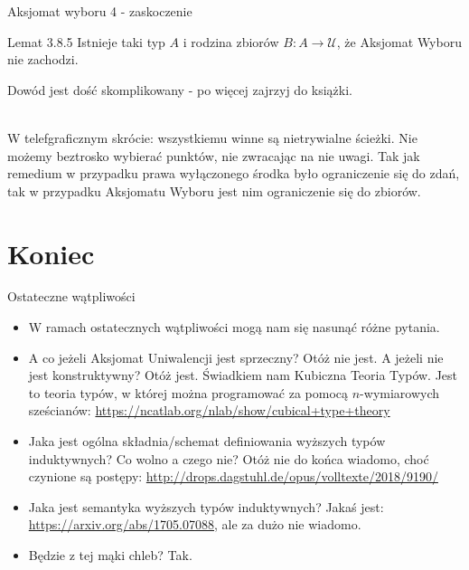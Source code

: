 \documentclass{beamer}
\newcommand{\U}{\mathcal{U}}
\begin{document}
\begin{frame}{Aksjomat wyboru 4 - zaskoczenie}

\begin{block}{Lemat 3.8.5}
Istnieje taki typ $A$ i rodzina zbiorów $B : A \to \U$, że Aksjomat Wyboru nie zachodzi.
\end{block}

Dowód jest dość skomplikowany - po więcej zajrzyj do książki. \\~\

W telefgraficznym skrócie: wszystkiemu winne są nietrywialne ścieżki. Nie możemy beztrosko wybierać punktów, nie zwracając na nie uwagi. Tak jak remedium w przypadku prawa wyłączonego środka było ograniczenie się do zdań, tak w przypadku Aksjomatu Wyboru jest nim ograniczenie się do zbiorów.

\end{frame}

\section{Koniec}

\begin{frame}{Ostateczne wątpliwości}
\begin{itemize}
	\item W ramach ostatecznych wątpliwości mogą nam się nasunąć różne pytania.
	\item A co jeżeli Aksjomat Uniwalencji jest sprzeczny? Otóż nie jest. A jeżeli nie jest konstruktywny? Otóż jest. Świadkiem nam Kubiczna Teoria Typów. Jest to teoria typów, w której można programować za pomocą $n$-wymiarowych sześcianów: \url{https://ncatlab.org/nlab/show/cubical+type+theory}
	\item Jaka jest ogólna składnia/schemat definiowania wyższych typów induktywnych? Co wolno a czego nie? Otóż nie do końca wiadomo, choć czynione są postępy: \url{http://drops.dagstuhl.de/opus/volltexte/2018/9190/}
	\item Jaka jest semantyka wyższych typów induktywnych? Jakaś jest: \url{https://arxiv.org/abs/1705.07088}, ale za dużo nie wiadomo.
	\item Będzie z tej mąki chleb? Tak.
\end{itemize}
\end{frame}
\end{document}
